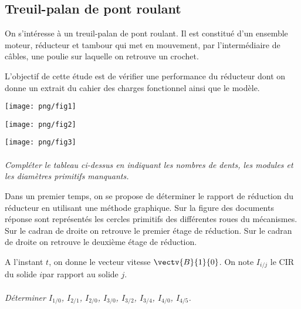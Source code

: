 \documentclass[11pt,oneside]{article}
\begin{document}
\subsection*{Treuil-palan de pont roulant}
\begin{minipage}[c]{.45\linewidth}
On s'intéresse à un treuil-palan de pont roulant. Il est constitué d'un ensemble moteur, réducteur et tambour qui met en mouvement, par l'intermédiaire de câbles, une poulie sur laquelle on retrouve un crochet.

L'objectif de cette étude est de vérifier une performance du réducteur dont on donne un extrait du cahier des charges fonctionnel ainsi que le modèle. 
\end{minipage}\hfill
\begin{minipage}[c]{.45\linewidth}
\begin{center}
\texttt{[image: png/fig1]}
\end{center}
\end{minipage}

\vspace{.5cm}

\begin{center}
\texttt{[image: png/fig2]}
\end{center}
\begin{center}
\texttt{[image: png/fig3]}
\end{center}
\paragraph{}
\textit{Compléter le tableau ci-dessus en indiquant les nombres de dents, les modules et les diamètres primitifs manquants.}


Dans un premier temps, on se propose de déterminer le rapport de réduction du réducteur en utilisant une méthode graphique. Sur la figure des documents réponse sont représentés les cercles primitifs des différentes roues du mécanismes. Sur le cadran de droite on retrouve le premier étage de réduction. Sur le cadran de droite on retrouve le deuxième étage de réduction.

A l'instant $t$, on donne le vecteur vitesse $\vectv{B}{1}{0}$. On note $I_{i/j}$ le CIR du solide $i$par rapport au solide $j$.

\paragraph{}
\textit{Déterminer $I_{1/0}$, $I_{2/1}$, $I_{2/0}$, $I_{3/0}$, $I_{3/2}$, $I_{3/4}$, $I_{4/0}$, $I_{4/5}$.}
\end{document}
